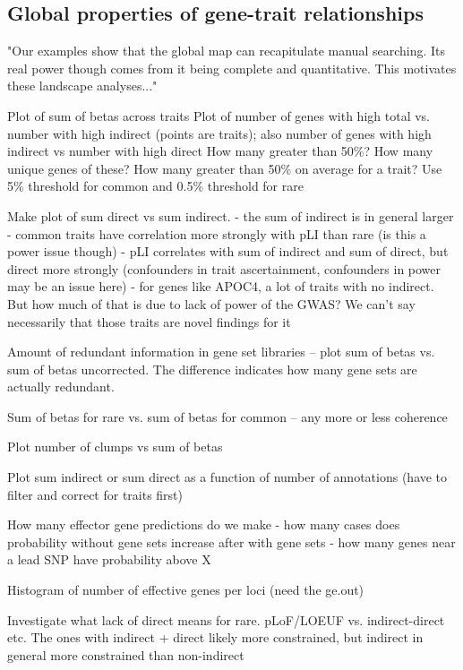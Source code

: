 \subsection{Global properties of gene-trait relationships}

"Our examples show that the global map can recapitulate manual searching. Its real power though comes from it being complete and quantitative. This motivates these landscape analyses..."

Plot of sum of betas across traits
Plot of number of genes with high total vs. number with high indirect (points are traits); also number of genes with high indirect vs number with high direct
How many greater than 50\%? How many unique genes of these?
How many greater than 50\% on average for a trait? Use 5\% threshold for common and 0.5\% threshold for rare

Make plot of sum direct vs sum indirect.
 - the sum of indirect is in general larger
 - common traits have correlation more strongly with pLI than rare (is this a power issue though)
 - pLI correlates with sum of indirect and sum of direct, but direct more strongly (confounders in trait ascertainment, confounders in power may be an issue here)
  - for genes like APOC4, a lot of traits with no indirect. But how much of that is due to lack of power of the GWAS? We can't say necessarily that those traits are novel findings for it


Amount of redundant information in gene set libraries -- plot sum of betas vs. sum of betas uncorrected. The difference indicates how many gene sets are actually redundant.

Sum of betas for rare vs. sum of betas for common -- any more or less coherence 

Plot number of clumps vs sum of betas

Plot sum indirect or sum direct as a function of number of annotations (have to filter and correct for traits first)

How many effector gene predictions do we make
 - how many cases does probability without gene sets increase after with gene sets
 - how many genes near a lead SNP have probability above X

 Histogram of number of effective genes per loci (need the ge.out)

Investigate what lack of direct means for rare. pLoF/LOEUF vs. indirect-direct etc. The ones with indirect + direct likely more constrained, but indirect in general more constrained than non-indirect

